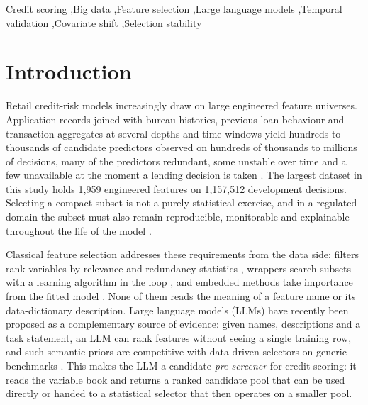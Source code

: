 \documentclass[final,5p,twocolumn]{elsarticle}
\begin{document}
\begin{frontmatter}
\begin{keyword}
Credit scoring \sep Big data \sep Feature selection \sep Large language models \sep Temporal validation \sep Covariate shift \sep Selection stability
\end{keyword}

\end{frontmatter}


\section{Introduction}
\label{sec:introduction}

Retail credit-risk models increasingly draw on large engineered feature universes. Application records joined with bureau histories, previous-loan behaviour and transaction aggregates at several depths and time windows yield hundreds to thousands of candidate predictors observed on hundreds of thousands to millions of decisions, many of the predictors redundant, some unstable over time and a few unavailable at the moment a lending decision is taken \cite{thomas2002,siddiqi2006}. The largest dataset in this study holds 1,959 engineered features on 1,157,512 development decisions. Selecting a compact subset is not a purely statistical exercise, and in a regulated domain the subset must also remain reproducible, monitorable and explainable throughout the life of the model \cite{lessmann2015,gunnarsson2021,ballegeer2025}.

Classical feature selection addresses these requirements from the data side: filters rank variables by relevance and redundancy statistics \cite{guyon2003,peng2005}, wrappers search subsets with a learning algorithm in the loop \cite{kohavi1997,guyon2002,kursa2010}, and embedded methods take importance from the fitted model \cite{tibshirani1996,lundberg2017}. None of them reads the meaning of a feature name or its data-dictionary description. Large language models (LLMs) have recently been proposed as a complementary source of evidence: given names, descriptions and a task statement, an LLM can rank features without seeing a single training row, and such semantic priors are competitive with data-driven selectors on generic benchmarks \cite{choi2022,jeong2025,li2025sigkdd,zhang2025llmlasso}. This makes the LLM a candidate \emph{pre-screener} for credit scoring: it reads the variable book and returns a ranked candidate pool that can be used directly or handed to a statistical selector that then operates on a smaller pool.
\end{document}
